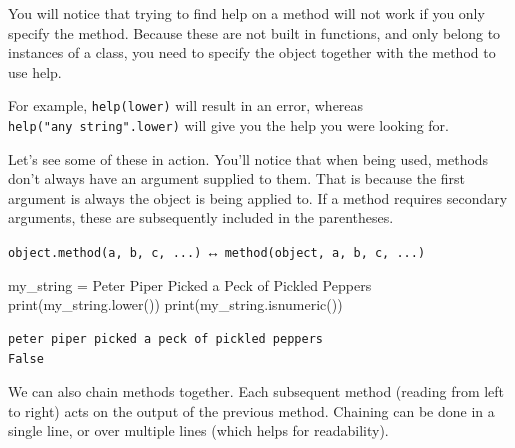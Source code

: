 \documentclass[
  letterpaper,
  DIV=11,
  numbers=noendperiod]{scrreprt}
\newenvironment{Shaded}{\begin{snugshade}}{\end{snugshade}}
\newcommand{\BuiltInTok}[1]{\textcolor[rgb]{0.00,0.23,0.31}{#1}}
\newcommand{\NormalTok}[1]{\textcolor[rgb]{0.00,0.23,0.31}{#1}}
\newcommand{\OperatorTok}[1]{\textcolor[rgb]{0.37,0.37,0.37}{#1}}
\newcommand{\StringTok}[1]{\textcolor[rgb]{0.13,0.47,0.30}{#1}}
\begin{document}
\begin{tcolorbox}[enhanced jigsaw, rightrule=.15mm, opacitybacktitle=0.6, colback=white, toprule=.15mm, colframe=quarto-callout-tip-color-frame, bottomtitle=1mm, bottomrule=.15mm, arc=.35mm, coltitle=black, breakable, title=\textcolor{quarto-callout-tip-color}{\faLightbulb}\hspace{0.5em}{Getting Help For Methods}, titlerule=0mm, opacityback=0, colbacktitle=quarto-callout-tip-color!10!white, left=2mm, toptitle=1mm, leftrule=.75mm]
You will notice that trying to find help on a method will not work if
you only specify the method. Because these are not built in functions,
and only belong to instances of a class, you need to specify the object
together with the method to use help.

For example, \texttt{help(lower)} will result in an error, whereas
\texttt{help("any\ string".lower)} will give you the help you were
looking for.
\end{tcolorbox}

Let's see some of these in action. You'll notice that when being used,
methods don't always have an argument supplied to them. That is because
the first argument is always the object is being applied to. If a method
requires secondary arguments, these are subsequently included in the
parentheses.

\texttt{object.method(a,\ b,\ c,\ ...)} ↔
\texttt{method(object,\ a,\ b,\ c,\ ...)}

\begin{Shaded}
\begin{Highlighting}[]
\NormalTok{my\_string }\OperatorTok{=} \StringTok{\textquotesingle{}Peter Piper Picked a Peck of Pickled Peppers\textquotesingle{}}
\BuiltInTok{print}\NormalTok{(my\_string.lower())}
\BuiltInTok{print}\NormalTok{(my\_string.isnumeric())}
\end{Highlighting}
\end{Shaded}

\begin{verbatim}
peter piper picked a peck of pickled peppers
False
\end{verbatim}

We can also chain methods together. Each subsequent method (reading from
left to right) acts on the output of the previous method. Chaining can
be done in a single line, or over multiple lines (which helps for
readability).
\end{document}
